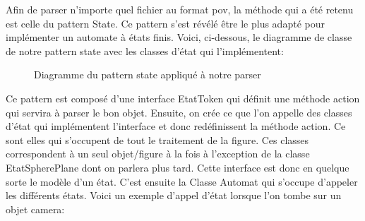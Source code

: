 \documentclass[../../Rapport RayTracer]{subfiles}
\begin{document}
Afin de parser n'importe quel fichier au format pov, la méthode qui a été retenu est celle du pattern State. Ce pattern s'est révélé être le plus adapté pour implémenter un automate à états finis. Voici, ci-dessous, le diagramme de classe de notre pattern state avec les classes d'état qui l'implémentent:

\begin{figure}[h!]
	
	\caption{Diagramme du pattern state appliqué à notre parser}
	\label{diagrammePatternState}
\end{figure}
\FloatBarrier

Ce pattern est composé d'une interface EtatToken qui définit une méthode action qui servira à parser le bon objet. Ensuite, on crée ce que l'on appelle des classes d'état qui implémentent l'interface et donc redéfinissent la méthode action. Ce sont elles qui s'occupent de tout le traitement de la figure. Ces classes correspondent à un seul objet/figure à la fois à l'exception de la classe EtatSpherePlane dont on parlera plus tard. Cette interface est donc en quelque sorte le modèle d'un état.
C'est ensuite la Classe Automat qui s'occupe d'appeler les différents états. Voici un exemple d'appel d'état lorsque l'on tombe sur un objet camera:
\end{document}

